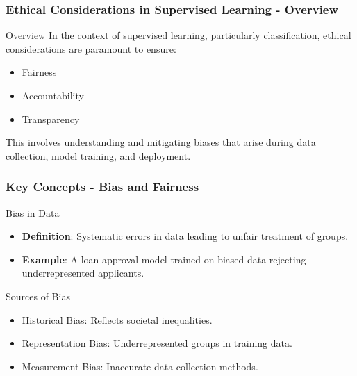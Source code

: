 \documentclass[aspectratio=169]{beamer}
\begin{document}
\begin{frame}[fragile]
    \frametitle{Ethical Considerations in Supervised Learning - Overview}
    \begin{block}{Overview}
        In the context of supervised learning, particularly classification, ethical considerations are paramount to ensure:
        \begin{itemize}
            \item Fairness
            \item Accountability
            \item Transparency
        \end{itemize}
        This involves understanding and mitigating biases that arise during data collection, model training, and deployment.
    \end{block}
\end{frame}

\begin{frame}[fragile]
    \frametitle{Key Concepts - Bias and Fairness}
    \begin{block}{Bias in Data}
        \begin{itemize}
            \item \textbf{Definition}: Systematic errors in data leading to unfair treatment of groups.
            \item \textbf{Example}: A loan approval model trained on biased data rejecting underrepresented applicants.
        \end{itemize}
    \end{block}
    
    \begin{block}{Sources of Bias}
        \begin{itemize}
            \item Historical Bias: Reflects societal inequalities.
            \item Representation Bias: Underrepresented groups in training data.
            \item Measurement Bias: Inaccurate data collection methods.
        \end{itemize}
    \end{block}
\end{frame}
\end{document}

